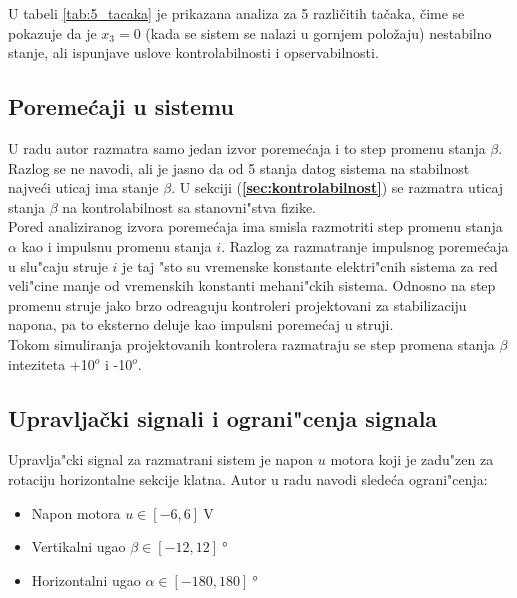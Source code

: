 \documentclass[a4paper,11pt]{article}
\theoremstyle{definition} \newtheorem{deff}{Definicija}[section]
\theoremstyle{definition} \newtheorem{prim}[deff]{Primer}
\theoremstyle{plain} \newtheorem{teor}[deff]{Teorema}
\begin{document}
	U tabeli \ref{tab:5_tacaka} je prikazana analiza za 5 različitih tačaka, čime se pokazuje da je $x_3 = 0$ (kada se sistem se nalazi u gornjem položaju) nestabilno stanje, ali ispunjave uslove kontrolabilnosti i opservabilnosti. 
	\\[16pt]
	
	\subsection{Poremećaji u sistemu}
	
	 U radu \cite{inicijalna} autor razmatra samo jedan izvor poreme\'caja i to step promenu stanja $\beta$. Razlog se ne navodi, ali je jasno da od 5 stanja datog sistema na stabilnost najve\'ci uticaj ima stanje $\beta$. U sekciji (\textbf{\ref{sec:kontrolabilnost}}) se razmatra uticaj stanja $\beta$ na kontrolabilnost sa stanovni"stva fizike. \\
	 
	 Pored analiziranog izvora poreme\'caja ima smisla razmotriti step promenu stanja $\alpha$ kao i impulsnu promenu stanja $i$. Razlog za razmatranje impulsnog poreme\'caja u slu"caju struje $i$ je taj "sto su vremenske konstante elektri"cnih sistema za red veli"cine manje od vremenskih konstanti mehani"ckih sistema. Odnosno na step promenu struje jako brzo odreaguju kontroleri projektovani za stabilizaciju napona, pa to eksterno deluje kao impulsni poreme\'caj u struji. \\
	 
	 Tokom simuliranja projektovanih kontrolera razmatraju se step promena stanja $\beta$ inteziteta +10$^o$ i -10$^o$. \\[16pt]
	 

	\subsection{Upravljački signali i ograni"cenja signala}
	
	Upravlja"cki signal za razmatrani sistem je napon $u$ motora koji je zadu"zen za rotaciju horizontalne sekcije klatna. Autor u radu \cite{inicijalna} navodi slede\'ca ograni"cenja:
	
	\begin{itemize}
		\item Napon motora $u \in [-6, 6] ~\text{V}$
		\item Vertikalni ugao  $\beta \in [-12, 12] ~\text{°}$
		\item Horizontalni ugao  $\alpha \in [-180, 180] ~\text{°}$
	\end{itemize}
	
\end{document}
